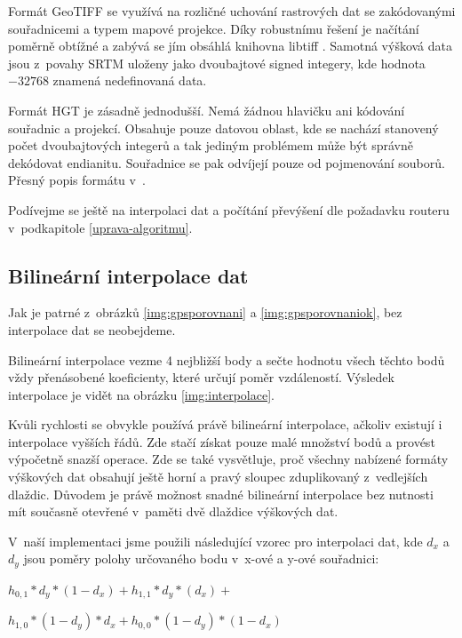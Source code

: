 \documentclass[thesis=B,czech]{FITthesis}[2012/06/26]
\begin{document}
Formát GeoTIFF se využívá na rozličné uchování rastrových dat se zakódovanými souřadnicemi a typem mapové projekce. Díky robustnímu řešení je načítání poměrně obtížné a zabývá se jím obsáhlá knihovna libtiff \cite{libtiff}. Samotná výšková data jsou z~povahy SRTM uloženy jako dvoubajtové signed integery, kde hodnota $-32768$ znamená nedefinovaná data.

Formát HGT je zásadně jednodušší. Nemá žádnou hlavičku ani kódování souřadnic a projekcí. Obsahuje pouze datovou oblast, kde se nachází stanovený počet dvoubajtových integerů a tak jediným problémem může být správně dekódovat endianitu. Souřadnice se pak odvíjejí pouze od pojmenování souborů. Přesný popis formátu v~\cite{srtm-manual}. 

Podívejme se ještě na interpolaci dat a počítání převýšení dle požadavku routeru v~podkapitole \ref{uprava-algoritmu}.


\subsection{Bilineární interpolace dat}
Jak je patrné z~obrázků \ref{img:gpsporovnani} a \ref{img:gpsporovnaniok}, bez interpolace dat se neobejdeme. 

Bilineární interpolace vezme 4 nejbližší body a sečte hodnotu všech těchto bodů vždy přenásobené koeficienty, které určují poměr vzdáleností. Výsledek interpolace je vidět na obrázku \ref{img:interpolace}.


Kvůli rychlosti se obvykle používá právě bilineární interpolace, ačkoliv existují i interpolace vyšších řádů. Zde stačí získat pouze malé množství bodů a provést výpočetně snazší operace. Zde se také vysvětluje, proč všechny nabízené formáty výškových dat obsahují ještě horní a pravý sloupec zduplikovaný z~vedlejších dlaždic. Důvodem je právě možnost snadné bilineární interpolace bez nutnosti mít současně otevřené v~paměti dvě dlaždice výškových dat.

V~naší implementaci jsme použili následující vzorec pro interpolaci dat, kde $d_x$ a $d_y$ jsou poměry polohy určovaného bodu v~x-ové a y-ové souřadnici:

$h_{0,1} * d_y * (1 - d_x) + h_{1,1} * d_y * (d_x) + $

$h_{1,0} * (1 - d_y) * d_x + h_{0,0} * (1 - d_y) * (1 - d_x) $
\end{document}
